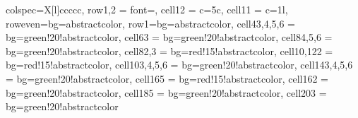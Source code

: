 \begin{tblr}{colspec={X[l]ccccc},
        row{1,2} = {font=\bfseries},
        cell{1}{2} = {c=5}{c},
        cell{1}{1} = {c=1}{l},
        row{even}={bg=abstractcolor},
        row{1}={bg=abstractcolor},
        cell{4}{3,4,5,6} = {bg=green!20!abstractcolor}, %
        cell{6}{3} = {bg=green!20!abstractcolor},
        cell{8}{4,5,6} = {bg=green!20!abstractcolor},
        cell{8}{2,3} = {bg=red!15!abstractcolor},
        cell{10,12}{2} = {bg=red!15!abstractcolor},
        cell{10}{3,4,5,6} = {bg=green!20!abstractcolor},
        cell{14}{3,4,5,6} = {bg=green!20!abstractcolor},
        cell{16}{5} = {bg=red!15!abstractcolor},
        cell{16}{2} = {bg=green!20!abstractcolor},
        cell{18}{5} = {bg=green!20!abstractcolor},
        cell{20}{3} = {bg=green!20!abstractcolor}
    }


\end{tblr}
